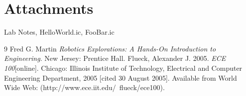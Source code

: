 \documentclass[a4paper, 11pt]{article}
\begin{document}
\section*{Attachments}
Lab Notes, HelloWorld.ic, FooBar.ic

\begin{thebibliography}{9}
 Fred G. Martin \emph{Robotics Explorations: A Hands-On Introduction to Engineering}. New Jersey: Prentice Hall.
  Flueck, Alexander J. 2005. \emph{ECE 100}[online]. Chicago: Illinois Institute of Technology, Electrical and Computer Engineering Department, 2005 [cited 30
August 2005]. Available from World Wide Web: (http://www.ece.iit.edu/~flueck/ece100).
\end{thebibliography}
\end{document}
